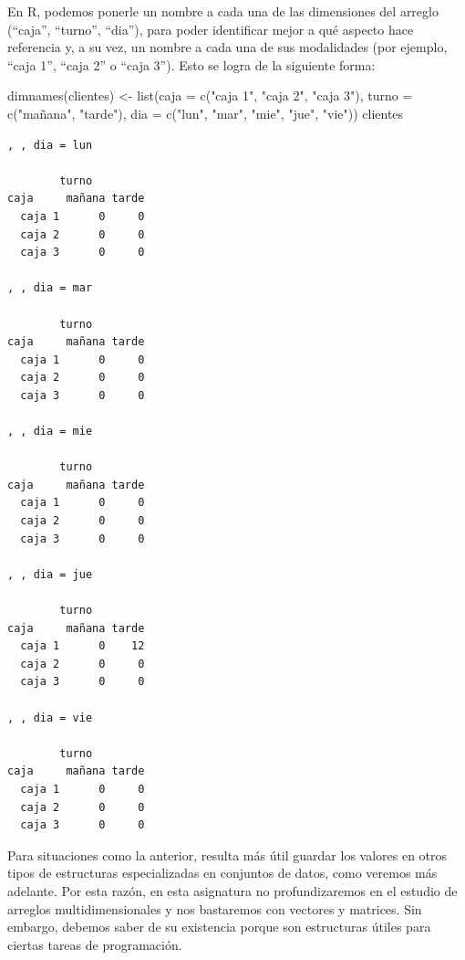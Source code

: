 \documentclass[
]{book}
\newenvironment{Shaded}{\begin{snugshade}}{\end{snugshade}}
\newcommand{\AttributeTok}[1]{\textcolor[rgb]{0.77,0.63,0.00}{#1}}
\newcommand{\FunctionTok}[1]{\textcolor[rgb]{0.00,0.00,0.00}{#1}}
\newcommand{\NormalTok}[1]{#1}
\newcommand{\OtherTok}[1]{\textcolor[rgb]{0.56,0.35,0.01}{#1}}
\newcommand{\StringTok}[1]{\textcolor[rgb]{0.31,0.60,0.02}{#1}}
\begin{document}
En R, podemos ponerle un nombre a cada una de las dimensiones del arreglo (``caja'', ``turno'', ``dia''), para poder identificar mejor a qué aspecto hace referencia y, a su vez, un nombre a cada una de sus modalidades (por ejemplo, ``caja 1'', ``caja 2'' o ``caja 3''). Esto se logra de la siguiente forma:

\begin{Shaded}
\begin{Highlighting}[]
\FunctionTok{dimnames}\NormalTok{(clientes) }\OtherTok{\textless{}{-}} \FunctionTok{list}\NormalTok{(}\AttributeTok{caja =} \FunctionTok{c}\NormalTok{(}\StringTok{"caja 1"}\NormalTok{, }\StringTok{"caja 2"}\NormalTok{, }\StringTok{"caja 3"}\NormalTok{),}
                           \AttributeTok{turno =} \FunctionTok{c}\NormalTok{(}\StringTok{"mañana"}\NormalTok{, }\StringTok{"tarde"}\NormalTok{),}
                           \AttributeTok{dia =} \FunctionTok{c}\NormalTok{(}\StringTok{"lun"}\NormalTok{, }\StringTok{"mar"}\NormalTok{, }\StringTok{"mie"}\NormalTok{, }\StringTok{"jue"}\NormalTok{, }\StringTok{"vie"}\NormalTok{))}
\NormalTok{clientes}
\end{Highlighting}
\end{Shaded}

\begin{verbatim}
, , dia = lun

        turno
caja     mañana tarde
  caja 1      0     0
  caja 2      0     0
  caja 3      0     0

, , dia = mar

        turno
caja     mañana tarde
  caja 1      0     0
  caja 2      0     0
  caja 3      0     0

, , dia = mie

        turno
caja     mañana tarde
  caja 1      0     0
  caja 2      0     0
  caja 3      0     0

, , dia = jue

        turno
caja     mañana tarde
  caja 1      0    12
  caja 2      0     0
  caja 3      0     0

, , dia = vie

        turno
caja     mañana tarde
  caja 1      0     0
  caja 2      0     0
  caja 3      0     0
\end{verbatim}

Para situaciones como la anterior, resulta más útil guardar los valores en otros tipos de estructuras especializadas en conjuntos de datos, como veremos más adelante. Por esta razón, en esta asignatura no profundizaremos en el estudio de arreglos multidimensionales y nos bastaremos con vectores y matrices. Sin embargo, debemos saber de su existencia porque son estructuras útiles para ciertas tareas de programación.
\end{document}
